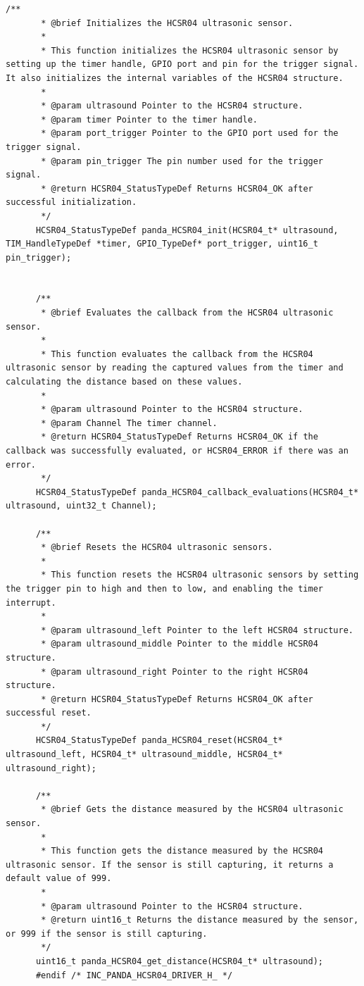 \documentclass{article}
\begin{document}
      \begin{lstlisting}[style=CStyle]
      /**
       * @brief Initializes the HCSR04 ultrasonic sensor.
       *
       * This function initializes the HCSR04 ultrasonic sensor by setting up the timer handle, GPIO port and pin for the trigger signal. It also initializes the internal variables of the HCSR04 structure.
       *
       * @param ultrasound Pointer to the HCSR04 structure.
       * @param timer Pointer to the timer handle.
       * @param port_trigger Pointer to the GPIO port used for the trigger signal.
       * @param pin_trigger The pin number used for the trigger signal.
       * @return HCSR04_StatusTypeDef Returns HCSR04_OK after successful initialization.
       */
      HCSR04_StatusTypeDef panda_HCSR04_init(HCSR04_t* ultrasound, TIM_HandleTypeDef *timer, GPIO_TypeDef* port_trigger, uint16_t pin_trigger);
      
      
      /**
       * @brief Evaluates the callback from the HCSR04 ultrasonic sensor.
       *
       * This function evaluates the callback from the HCSR04 ultrasonic sensor by reading the captured values from the timer and calculating the distance based on these values.
       *
       * @param ultrasound Pointer to the HCSR04 structure.
       * @param Channel The timer channel.
       * @return HCSR04_StatusTypeDef Returns HCSR04_OK if the callback was successfully evaluated, or HCSR04_ERROR if there was an error.
       */
      HCSR04_StatusTypeDef panda_HCSR04_callback_evaluations(HCSR04_t* ultrasound, uint32_t Channel);
      
      /**
       * @brief Resets the HCSR04 ultrasonic sensors.
       *
       * This function resets the HCSR04 ultrasonic sensors by setting the trigger pin to high and then to low, and enabling the timer interrupt.
       *
       * @param ultrasound_left Pointer to the left HCSR04 structure.
       * @param ultrasound_middle Pointer to the middle HCSR04 structure.
       * @param ultrasound_right Pointer to the right HCSR04 structure.
       * @return HCSR04_StatusTypeDef Returns HCSR04_OK after successful reset.
       */
      HCSR04_StatusTypeDef panda_HCSR04_reset(HCSR04_t* ultrasound_left, HCSR04_t* ultrasound_middle, HCSR04_t* ultrasound_right);
      
      /**
       * @brief Gets the distance measured by the HCSR04 ultrasonic sensor.
       *
       * This function gets the distance measured by the HCSR04 ultrasonic sensor. If the sensor is still capturing, it returns a default value of 999.
       *
       * @param ultrasound Pointer to the HCSR04 structure.
       * @return uint16_t Returns the distance measured by the sensor, or 999 if the sensor is still capturing.
       */
      uint16_t panda_HCSR04_get_distance(HCSR04_t* ultrasound);
      #endif /* INC_PANDA_HCSR04_DRIVER_H_ */
      \end{lstlisting}      
\end{document}
